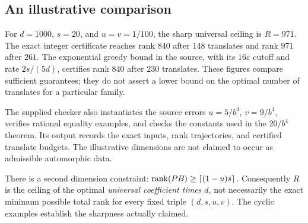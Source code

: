 \subsection{An illustrative comparison}

For $d=1000$, $s=20$, and $u=v=1/100$, the sharp universal ceiling is
$R=971$. The exact integer certificate reaches rank $840$ after $148$
translates and rank $971$ after $261$. The exponential greedy bound in
the source, with its $16\varepsilon$ cutoff and rate $2s/(5d)$, certifies
rank $840$ after $230$ translates. These figures compare sufficient
guarantees; they do not assert a lower bound on the optimal number of
translates for a particular family.

The supplied checker also instantiates the source errors
$u=5/b^4$, $v=9/b^4$, verifies rational equality examples, and checks the
constants used in the $20/b^4$ theorem. Its output records the exact inputs,
rank trajectories, and certified translate budgets. The illustrative
dimensions are not claimed to occur as admissible automorphic data.

There is a second dimension constraint:
$\operatorname{rank}(PB)\ge\lceil(1-u)s\rceil$. Consequently $R$ is the ceiling of the
optimal \emph{universal coefficient times $d$}, not necessarily the
exact minimum possible total rank for every fixed triple $(d,s,u,v)$.
The cyclic examples establish the sharpness actually claimed.
